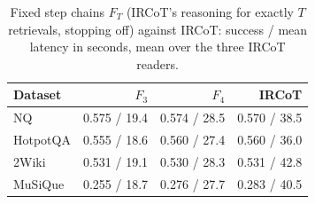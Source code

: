 \begin{table}[t]
\centering\small
\setlength{\tabcolsep}{4pt}
\caption{Fixed step chains $F_T$ (IRCoT's reasoning for exactly $T$ retrievals, stopping off) against IRCoT: success / mean latency in seconds, mean over the three IRCoT readers.}
\label{tab:multistep_col}
\begin{tabular*}{\linewidth}{@{\extracolsep{\fill}}lrrr}
\toprule
Dataset & $F_3$ & $F_4$ & IRCoT \\
\midrule
NQ & 0.575 / 19.4 & 0.574 / 28.5 & 0.570 / 38.5 \\
HotpotQA & 0.555 / 18.6 & 0.560 / 27.4 & 0.560 / 36.0 \\
2Wiki & 0.531 / 19.1 & 0.530 / 28.3 & 0.531 / 42.8 \\
MuSiQue & 0.255 / 18.7 & 0.276 / 27.7 & 0.283 / 40.5 \\
\bottomrule
\end{tabular*}
\end{table}
